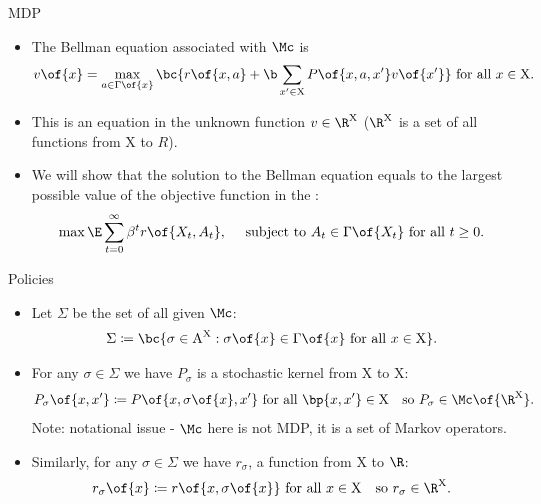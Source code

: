 \documentclass[11pt,xcolor={dvipsnames},aspectratio=159,hyperref={pdftex,pdfpagemode=UseNone,hidelinks,pdfdisplaydoctitle=true},usepdftitle=false]{beamer}
\begin{document}
\begin{frame}{MDP}   
    \begin{itemize}
        \item The Bellman equation associated with $\Mc$ is \begin{align*}
            v\of{x} = \max_{a \in \Gamma\of{x}} \bc{r\of{x,a} + \b \sum_{x^\prime \in \text{X}} P\of{x,a,x^\prime} v\of{x^\prime}} \text{ for all } x \in \text{X}.
        \end{align*}
        \item This is an equation in the unknown function $v \in \R^{\text{X}}$ ($\R^{\text{X}}$ is a set of all functions from $\text{X}$ to $R$).
        \item We will show that the solution to the Bellman equation equals to the largest possible value of the objective function in the :     
        \begin{align*}
           \max \E \sum_{t=0}^\infty \beta^t r\of{X_t,A_t}, \quad \text{ subject to } A_t \in \Gamma\of{X_t} \text{ for all } t \geq 0. 
        \end{align*}
    \end{itemize}
    \end{frame}

\begin{frame}{Policies}   
    \begin{itemize}
        \item Let $\Sigma$ be the set of all  given $\Mc$: \begin{align*}
            \Sigma \coloneq \bc{\sigma \in \text{A}^\text{X} : \sigma\of{x}\in\Gamma\of{x} \text{ for all } x \in \text{X}}.
        \end{align*}
        \item For any $\sigma \in \Sigma$ we have $P_\sigma$ is a stochastic kernel from $\text{X}$ to $\text{X}$: \begin{align*}
            P_\sigma\of{x,x^\prime} \coloneq P\of{x,\sigma\of{x},x^\prime} \text{ for all } \bp{x,x^\prime} \in \text{X}\quad \text{so } P_\sigma\in\Mc\of{\R^\text{X}}.
            \end{align*}
            {\color{gray} Note: notational issue - $\Mc$ here is not MDP, it is a set of Markov operators.}
            \item Similarly, for any $\sigma \in \Sigma$ we have $r_\sigma$, a function from $\text{X}$ to $\R$: \begin{align*}
            r_\sigma\of{x} \coloneq r\of{x,\sigma\of{x}} \text{ for all } x \in \text{X}\quad \text{so } r_\sigma\in\R^\text{X}.
            \end{align*}
    \end{itemize}
    \end{frame}
\end{document}
